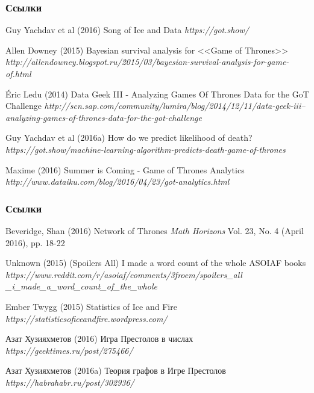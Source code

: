 \documentclass{beamer}
\begin{document}

\begin{frame}
\frametitle{Ссылки}
\footnotesize{
\begin{thebibliography}{99} %
 Guy Yachdav et al (2016)
\newblock Song of Ice and Data
\newblock \emph{https://got.show/} 

 Allen Downey (2015)
\newblock Bayesian survival analysis for <<Game of Thrones>>
\newblock \emph{http://allendowney.blogspot.ru/2015/03/bayesian-survival-analysis-for-game-of.html} 

 Éric Ledu (2014)
\newblock Data Geek III - Analyzing Games Of Thrones Data for the GoT Challenge
\newblock \emph{http://scn.sap.com/community/lumira/blog/2014/12/11/data-geek-iii--analyzing-games-of-thrones-data-for-the-got-challenge} 

 Guy Yachdav et al (2016a)
\newblock How do we predict likelihood of death?
\newblock \emph{https://got.show/machine-learning-algorithm-predicts-death-game-of-thrones}

 Maxime (2016)
\newblock Summer is Coming - Game of Thrones Analytics
\newblock \emph{http://www.dataiku.com/blog/2016/04/23/got-analytics.html}

\end{thebibliography}
}
\end{frame}

\begin{frame}
\frametitle{Ссылки}
\footnotesize{
\begin{thebibliography}{99}

 Beveridge, Shan (2016)
\newblock Network of Thrones
\newblock \emph{Math Horizons} Vol. 23, No. 4 (April 2016), pp. 18-22

 Unknown (2015)
\newblock (Spoilers All) I made a word count of the whole ASOIAF books
\newblock \emph{https://www.reddit.com/r/asoiaf/comments/3froem/spoilers\_all\\\_i\_made\_a\_word\_count\_of\_the\_whole}

 Ember Twygg (2015)
\newblock Statistics of Ice and Fire
\newblock \emph{https://statisticsoficeandfire.wordpress.com/} 

 Азат Хузияхметов (2016)
\newblock Игра Престолов в числах
\newblock \emph{https://geektimes.ru/post/275466/}

 Азат Хузияхметов (2016a)
\newblock Теория графов в Игре Престолов
\newblock \emph{https://habrahabr.ru/post/302936/}

\end{thebibliography}
}
\end{frame}
\end{document}

